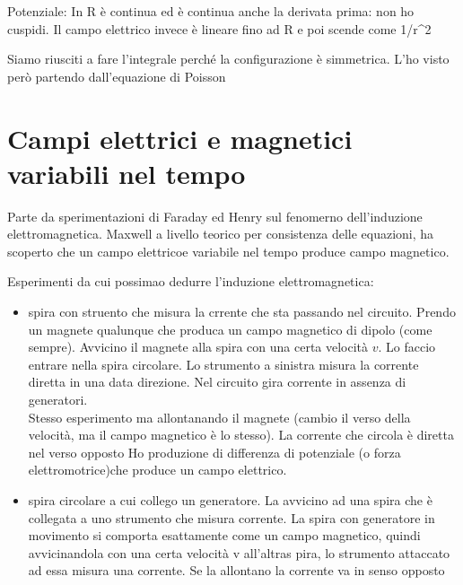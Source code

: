 \begin{equatino*}
\begin{example}
	
	Potenziale:	In R è continua ed è continua anche la derivata prima: non ho cuspidi. 
	Il campo elettrico invece è lineare fino ad R e poi scende come 1/r^2
	
	Siamo riusciti a fare l'integrale perché la configurazione è simmetrica.
	L'ho visto però partendo dall'equazione di Poisson
\end{example}

\section{Campi elettrici e magnetici variabili nel tempo}
Parte da sperimentazioni di Faraday ed Henry sul fenomerno dell'induzione elettromagnetica. Maxwell a livello teorico per consistenza delle equazioni, ha scoperto che un campo elettricoe variabile nel tempo produce campo magnetico.


Esperimenti da cui possimao dedurre l'induzione elettromagnetica:

\begin{itemize}
	\item spira con struento che misura la crrente che sta passando nel circuito. Prendo un magnete qualunque che produca un campo magnetico di dipolo (come sempre). Avvicino il magnete alla spira con una certa velocità $v$. Lo faccio entrare nella spira circolare. Lo strumento a sinistra misura la corrente diretta in una data direzione. Nel circuito gira corrente in assenza di generatori.\\
	Stesso esperimento ma allontanando il magnete (cambio il verso della velocità, ma il campo magnetico è lo stesso). La corrente che circola è diretta nel verso opposto
	Ho produzione di differenza di potenziale (o forza elettromotrice)che produce un campo elettrico.
	\item spira circolare a cui collego un generatore. La avvicino ad una spira che è collegata a uno strumento che misura corrente. La spira con generatore in movimento si comporta esattamente come un campo magnetico, quindi avvicinandola con una certa velocità v all'altras pira, lo strumento attaccato ad essa misura una corrente. Se la allontano la corrente va in senso opposto
	

\end{itemize}
\end{equatino*}
